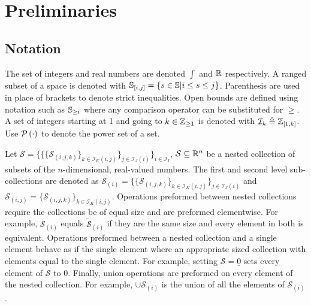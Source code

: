 \section{Preliminaries}
\subsection{Notation}
The set of integers and real numbers are denoted $\int$ and $\mathbb{R}$ respectively. A ranged subset of a space is denoted with $\mathbb{S}_{[i,j]}=\{s\in\mathbb{S}|i\leq s\leq j\}$. Parenthesis are used in place of brackets to denote strict inequalities. Open bounds are defined using notation such as $\mathbb{S}_{\geq i}$ where any comparison operator can be substituted for $\geq$. A set of integers starting at 1 and going to $k\in\mathbb{Z}_{\geq 1}$ is denoted with $\mathcal{I}_{k}\triangleq\mathbb{Z}_{[1,k]}$. Use $\mathcal{P}\left(\cdot\right)$ to denote the power set of a set. 

Let $\mathcal{S}=\{\{\{\mathcal{S}_{(i,j,k)}\}_{k\in\mathcal{I}_{K}(i,j)}\}_{j\in\mathcal{I}_{J}(i)}\}_{i\in\mathcal{I}_I}$, $\mathcal{S}\subseteq\mathbb{R}^n$ be a nested collection of subsets of the $n$-dimensional, real-valued numbers. The first and second level sub-collections are denoted as $\mathcal{S}_{(i)}=\{\{\mathcal{S}_{(i,j,k)}\}_{k\in\mathcal{I}_{K}(i,j)}\}_{j\in\mathcal{I}_{J}(i)}$ and $\mathcal{S}_{(i,j)}=\{\mathcal{S}_{(i,j,k)}\}_{k\in\mathcal{I}_{K}(i,j)}$. Operations preformed between nested collections require the collections be of equal size and are preformed elementwise. For example, $\mathcal{S}_{(i)}$ equals $\tilde{\mathcal{S}}_{(i)}$ if they are the same size and every element in both is equivalent. Operations preformed between a nested collection and a single element behave as if the single element where an appropriate sized collection with elements equal to the single element. For example, setting $\mathcal{S}=\underline{0}$ sets every element of $\mathcal{S}$ to $\underline{0}$. Finally, union operations are preformed on every element of the nested collection. For example, $\cup \mathcal{S}_{(i)}$ is the union of all the elements of $\mathcal{S}_{(i)}$.

